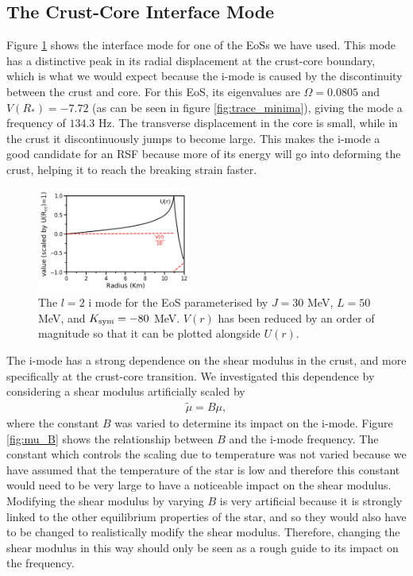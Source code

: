 \documentclass[fleqn,usenatbib]{mnras}
\begin{document}
\subsection{The Crust-Core Interface Mode}
\hspace{\parindent}Figure \ref{fig:2i_mode} shows the interface mode for one of the EoSs we have used. This mode has a distinctive peak in its radial displacement at the crust-core boundary, which is what we would expect because the i-mode is caused by the discontinuity between the crust and core. For this EoS, its eigenvalues are $\Omega=0.0805$ and $V(R_*)=-7.72$ (as can be seen in figure \ref{fig:trace_minima}), giving the mode a frequency of $134.3$ Hz. The transverse displacement in the core is small, while in the crust it discontinuously jumps to become large. This makes the i-mode a good candidate for an RSF because more of its energy will go into deforming the crust, helping it to reach the breaking strain faster.

\begin{figure}
\centering
\includegraphics[width=0.45\textwidth,angle=0]{2i2_30_50_-80.png}
\caption{The $l=2$ i mode for the EoS parameterised by $J=30$ MeV, $L=50$ MeV, and $K_{\rm sym}=-80$ MeV. $V(r)$ has been reduced by an order of magnitude so that it can be plotted alongside $U(r)$.}
\label{fig:2i_mode}
\end{figure}

\hspace{\parindent}The i-mode has a strong dependence on the shear modulus in the crust, and more specifically at the crust-core transition. We investigated this dependence by considering a shear modulus artificially scaled by 
\begin{align}
\tilde{\mu} = B \mu,
\end{align}
\noindent where the constant $B$ was varied to determine its impact on the i-mode. Figure \ref{fig:mu_B} shows the relationship between $B$ and the i-mode frequency. The constant which controls the scaling due to temperature was not varied because we have assumed that the temperature of the star is low and therefore this constant would need to be very large to have a noticeable impact on the shear modulus. Modifying the shear modulus by varying $B$ is very artificial because it is strongly linked to the other equilibrium properties of the star, and so they would also have to be changed to realistically modify the shear modulus. Therefore, changing the shear modulus in this way should only be seen as a rough guide to its impact on the frequency.
\end{document}
